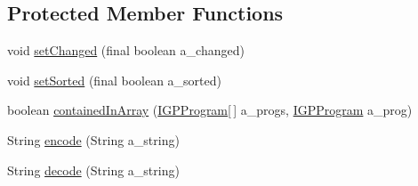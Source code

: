\subsection*{Protected Member Functions}
\begin{DoxyCompactItemize}
\item 
void \hyperlink{classorg_1_1jgap_1_1gp_1_1impl_1_1_g_p_population_a77008e555c1d551716a52eb849694a7b}{set\-Changed} (final boolean a\-\_\-changed)
\item 
void \hyperlink{classorg_1_1jgap_1_1gp_1_1impl_1_1_g_p_population_a863f5c2070d60fbf599fcf49230baec1}{set\-Sorted} (final boolean a\-\_\-sorted)
\item 
boolean \hyperlink{classorg_1_1jgap_1_1gp_1_1impl_1_1_g_p_population_ac6941b5054925d718727279f7e67416a}{contained\-In\-Array} (\hyperlink{interfaceorg_1_1jgap_1_1gp_1_1_i_g_p_program}{I\-G\-P\-Program}\mbox{[}$\,$\mbox{]} a\-\_\-progs, \hyperlink{interfaceorg_1_1jgap_1_1gp_1_1_i_g_p_program}{I\-G\-P\-Program} a\-\_\-prog)
\item 
String \hyperlink{classorg_1_1jgap_1_1gp_1_1impl_1_1_g_p_population_ac97f9a8c11750bed24a8cfc486b7f44a}{encode} (String a\-\_\-string)
\item 
String \hyperlink{classorg_1_1jgap_1_1gp_1_1impl_1_1_g_p_population_a0a0818d5aae810ab518784a75743933a}{decode} (String a\-\_\-string)
\end{DoxyCompactItemize}
